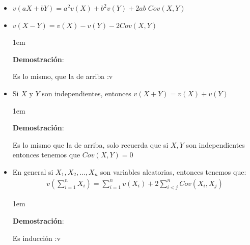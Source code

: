 \documentclass[12pt, fleqn]{report}                             %
\newenvironment{SmallIndentation}[1][0.75em]                    %
        {\begin{adjustwidth}{#1}{}\begin{footnotesize}}             %
        {\end{footnotesize}\end{adjustwidth}}                       %
\theoremstyle{break}                                            %
\newcommand{\Wrap}[1]           {\left( #1 \right)}             %
\begin{document}
\begin{itemize}
\begin{SmallIndentation}[1em]
                        \end{SmallIndentation}

                    \clearpage

                    \item 
                        $v(aX + bY) = a^2v(X) + b^2v(Y) + 2ab \; Cov(X,Y)$

                    \item 
                        $v(X - Y) = v(X) - v(Y) - 2Cov(X,Y)$

                        \begin{SmallIndentation}[1em]
                            \textbf{Demostración}:
                            
                            Es lo mismo, que la de arriba :v
                        
                        \end{SmallIndentation}
                            

                    \item
                        Si $X$ y $Y$ son independientes, entonces $v(X + Y) = v(X) + v(Y)$

                        \begin{SmallIndentation}[1em]
                            \textbf{Demostración}:
                            
                            Es lo mismo que la de arriba, solo recuerda que si $X, Y$ son independientes
                            entonces tenemos que $Cov(X, Y) = 0$
                        
                        \end{SmallIndentation}
                            

                    \item
                        En general si $X_1, X_2, \dots, X_n$ son variables aleatorias, entonces
                        tenemos que:
                        \begin{align*}
                            v\Wrap{\sum_{i = 1}^n X_i} = \sum_{i = 1}^n v(X_i) + 2\sum_{i < j}^n Cov(X_i, X_j)
                        \end{align*}

                        \begin{SmallIndentation}[1em]
                            \textbf{Demostración}:
                            
                            Es inducción :v
                        
                        \end{SmallIndentation}
                            

                    \end{itemize}
                            
\end{document}
